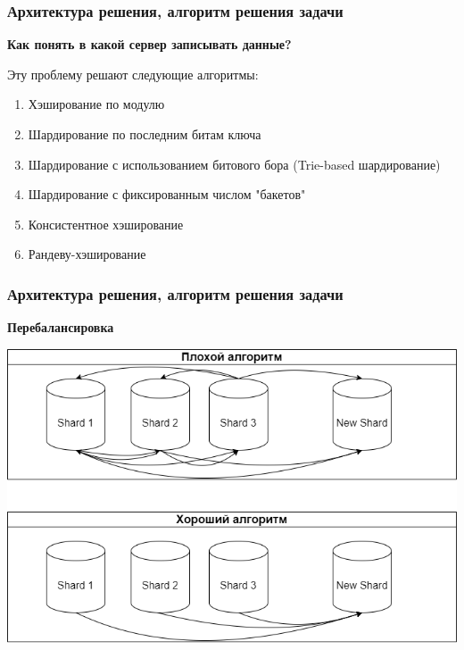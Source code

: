 \documentclass[pdf, hyperref={unicode}, aspectratio=169]{beamer}
\begin{document}
\begin{frame}
	\frametitle{Архитектура решения, алгоритм решения задачи}
  
	\textbf{Как понять в какой сервер записывать данные?}
  
	\vspace{1.5em}
  
	Эту проблему решают следующие алгоритмы:
  
	\begin{enumerate}
		\item Хэширование по модулю
		\item Шардирование по последним битам ключа
		\item Шардирование с использованием битового бора (Trie-based шардирование)
		\item Шардирование с фиксированным числом "бакетов"
		\item Консистентное хэширование
		\item Рандеву-хэширование
	\end{enumerate}
\end{frame}

\begin{frame}
	\frametitle{Архитектура решения, алгоритм решения задачи}
	\textbf{Перебалансировка}

	\vspace{1.5em}
	\centering
	\includegraphics[width=\textheight]{img/resharding.png}


\end{frame}
\end{document}
